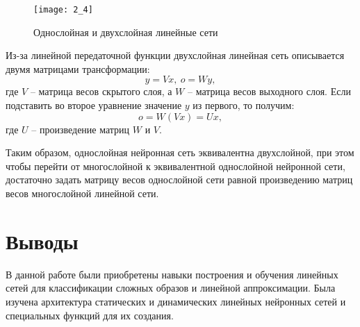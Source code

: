 \vspace{-0.7cm}
\begin{figure}[H]
\begin{center}
	\texttt{[image: 2\_4]}
	\caption{Однослойная и двухслойная линейные сети}
	\label{fig:2_4}
\end{center}
\end{figure}
\vspace{-0.7cm}

Из-за линейной передаточной функции двухслойная линейная сеть описывается двумя матрицами трансформации:
\begin{equation*}
y = Vx,\ o = Wy,
\end{equation*}
где $V$ -- матрица весов скрытого слоя, а $W$ -- матрица весов выходного слоя. Если подставить во второе уравнение значение $y$ из первого, то получим:
\begin{equation*}
o = W(Vx) = Ux,
\end{equation*}
где $U$ -- произведение матриц $W$ и $V$. 

Таким образом, однослойная нейронная сеть эквивалентна двухслойной, при этом чтобы перейти от многослойной к эквивалентной однослойной нейронной сети, достаточно задать матрицу весов однослойной сети равной произведению матриц весов многослойной линейной сети. 

\section{Выводы}

В данной работе были приобретены навыки построения и обучения линейных сетей для классификации сложных образов и линейной аппроксимации. Была изучена архитектура статических и динамических линейных нейронных сетей и специальных функций для их создания.

